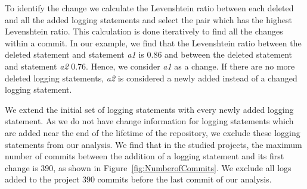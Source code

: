 To identify the change we calculate the Levenshtein ratio between each deleted and all the added logging statements and select the pair which has the highest Levenshtein ratio. This calculation is done iteratively to find all the changes within a commit. In our example, we find that the Levenshtein ratio between the deleted statement and statement \emph{a1} is 0.86 and between the deleted statement and statement \emph{a2} 0.76. Hence, we consider \emph{a1} as a change. If there are no more deleted logging statements, \emph{a2} is considered a newly added instead of a changed logging statement. 

We extend the initial set of logging statements with every newly added logging statement. 
As we do not have change information for logging statements which are added near the end of the lifetime of the repository, we exclude these logging statements from our analysis. We find that in the studied projects, the maximum number of commits between the addition of a logging statement and its first change is 390, as shown in Figure~\ref{fig:NumberofCommits}. We exclude all logs added to the project 390 commits before the last commit of our analysis. 










